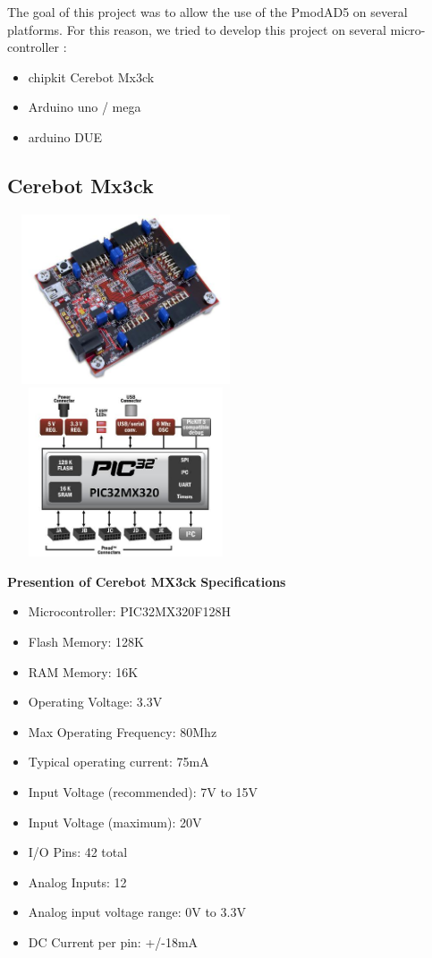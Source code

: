 \documentclass[10pt,a4paper]{report}
\begin{document}
The goal of this project was to allow the use of the PmodAD5 on several platforms. For this reason, we tried to develop this project on several micro-controller :
\begin{itemize}
\item chipkit Cerebot Mx3ck
\item Arduino uno / mega 
\item arduino DUE
\end{itemize} 

\subsection{Cerebot Mx3ck}



\includegraphics[width=7cm,height=50mm]{chipkitcerebotmx3ck}
\includegraphics[width=7cm,height=50mm]{chipkitcerebotmx3ck2}





\textbf{Presention of Cerebot MX3ck}
\textbf{Specifications}
\begin{itemize}
\item Microcontroller: PIC32MX320F128H
\item Flash Memory: 128K
\item RAM Memory: 16K
\item Operating Voltage: 3.3V
\item Max Operating Frequency: 80Mhz
\item Typical operating current: 75mA
\item Input Voltage (recommended): 7V to 15V
\item Input Voltage (maximum): 20V
\item I/O Pins: 42 total
\item Analog Inputs: 12
\item Analog input voltage range: 0V to 3.3V
\item DC Current per pin: +/-18mA \\
\end{itemize}
\end{document}
